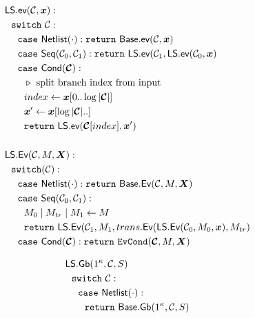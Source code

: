 \begin{figure}
  \begin{adjustwidth}{-0.1\textwidth}{-0.1\textwidth}
  \centering
  \begin{minipage}[t]{0.56\linewidth}
    \vspace{0pt}
    \begin{align*}
      &\ourscheme.\gev(\cir, \cirinp):\\
      &~~\switch~\cir:\\
      &~~~~\ccase~\netlist(\cdot): \creturn~\underscheme.\gev(\cir, \cirinp)\\
      &~~~~\ccase~\sequential(\cir_0, \cir_1): \creturn~\ourscheme.\gev(\cir_1, \ourscheme.\gev(\cir_0, \cirinp)\\
      &~~~~\ccase~\conditional(\vec{\cir}):\\
      &~~~~~~\codecomment{split branch index from input}\\
      &~~~~~~index \gets \cirinp[0..\log |\vec \cir|]\\
      &~~~~~~\cirinp' \gets \cirinp[\log |\vec \cir|..]\\
      &~~~~~~\creturn~\ourscheme.\gev(\vec{\cir}[index], \cirinp')\\
      \\
      &\ourscheme.\gEv(\cir,\mat,\gcirinp):\\
      &~~\switch(\cir):\\
      &~~~~\ccase~\netlist(\cdot): \creturn~\underscheme.\gEv(\cir,\mat,\gcirinp)\\
      &~~~~\ccase~\sequential(\cir_0, \cir_1): \\
      &~~~~~~\mat_0\mid\mat_{tr}\mid\mat_1 \gets \mat\\
      &~~~~~~\creturn~\ourscheme.\gEv(\cir_1, \mat_1, \evtranslate(\ourscheme.\gEv(\cir_0, \mat_0, \cirinp), \mat_{tr})\\
      &~~~~\ccase~\conditional(\vec \cir): \creturn~\evcond(\vec \cir, \mat, \gcirinp)
    \end{align*}
  \end{minipage}
  \begin{minipage}[t]{0.40\linewidth}
    \vspace{0pt}
    \begin{align*}
      &\ourscheme.\gGb(1^\kappa, \cir, S)\\
      &~~\switch~\cir:\\
      &~~~~\ccase~\netlist(\cdot):\\
      &~~~~~~\creturn~\underscheme.\gGb(1^\kappa,\cir,S)\\

\end{align*}
\end{minipage}
\end{adjustwidth}
\end{figure}

